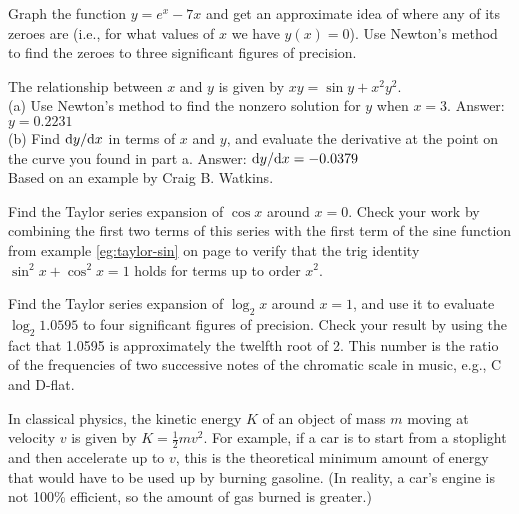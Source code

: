 
\begin{hwsection}
\begin{hw}
Graph the function $y=e^x-7x$ and get an approximate idea of where any of its zeroes
are (i.e., for what values of $x$ we have $y(x)=0$).
Use Newton's method to find the zeroes to three significant figures of precision.
\end{hw}

\begin{hw}
The relationship between $x$ and $y$ is given by $xy = \sin y+x^2y^2$.\\
(a) Use Newton's method to find the nonzero solution for $y$ when $x=3$. Answer: $y=0.2231$\\
(b) Find $\textup{d} y/\textup{d} x$ in terms of $x$ and $y$, and evaluate the derivative
at the point on the curve you found in part a. Answer: $\textup{d} y/\textup{d} x=-0.0379$\\
{\footnotesize Based on an example by Craig B. Watkins.}
\end{hw}

\begin{hw}
Find the Taylor series expansion of $\cos x$ around $x=0$. Check your work by combining the first two
terms of this series with the first term of the sine function from example \ref{eg:taylor-sin}
on page \pageref{eg:taylor-sin} to verify that the trig identity $\sin^2 x+\cos^2 x=1$ holds
for terms up to order $x^2$.
\end{hw}

\begin{hw}
Find the Taylor series expansion of $\log_2 x$ around $x=1$, and use it to evaluate
$\log_2 1.0595$ to four significant figures of precision. Check your result by using the
fact that 1.0595 is approximately the twelfth root of 2. This number is the ratio of
the frequencies of two successive notes of the chromatic scale
in music, e.g., C and D-flat.
\end{hw}

\begin{hw}
In classical physics, the kinetic energy $K$ of an object of mass $m$ moving at velocity $v$
is given by $K=\frac{1}{2}mv^2$. For example, if a car is to start from a stoplight and then
accelerate up to $v$, this is
the theoretical minimum amount of energy  that would have to be used up by burning gasoline.
(In reality, a car's engine is not 100\% efficient, so the amount of gas burned is greater.)


\end{hw}
\end{hwsection}
